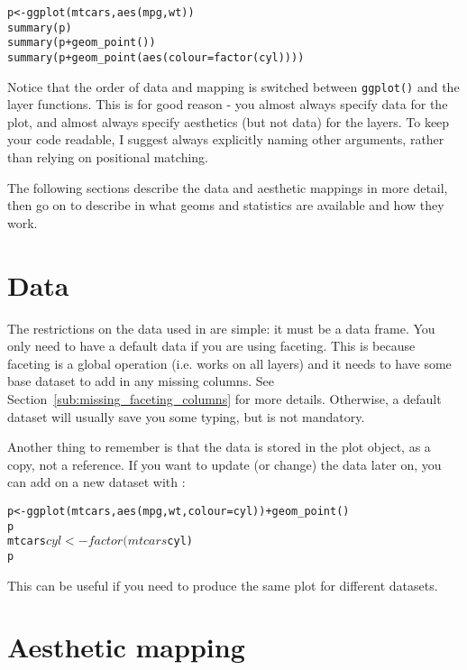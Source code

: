 %

\begin{alltt}
p <- ggplot(mtcars, aes(mpg, wt))
summary(p)
summary(p + geom_point())
summary(p + geom_point(aes(colour = factor(cyl))))
\end{alltt}

Notice that the order of data and mapping is switched between {\tt ggplot()} and the layer functions.  This is for good reason - you almost always specify data for the plot, and almost always specify aesthetics (but not data) for the layers.  To keep your code readable, I suggest always explicitly naming other arguments, rather than relying on positional matching.

The following sections describe the data and aesthetic mappings in more detail, then go on to describe in what geoms and statistics are available and how they work.

\section{Data}
\label{sec:data}

The restrictions on the data used in \ggplot are simple: it must be a data frame.  You only need to have a default data if you are using faceting.  This is because faceting is a global operation (i.e. works on all layers) and it needs to have some base dataset to add in any missing columns.  See Section~\ref{sub:missing_faceting_columns} for more details.  Otherwise, a default dataset will usually save you some typing, but is not mandatory.

Another thing to remember is that the data is stored in the plot object, as a copy, not a reference.  If you want to update (or change) the data later on, you can add on a new dataset with \code{\%+\%}:

\begin{alltt}
p <- ggplot(mtcars, aes(mpg, wt, colour = cyl)) + geom_point()
p
mtcars$cyl <- factor(mtcars$cyl)
p %+% mtcars
\end{alltt}

\noindent This can be useful if you need to produce the same plot for different datasets.

\section{Aesthetic mapping}
\label{sec:aes}

